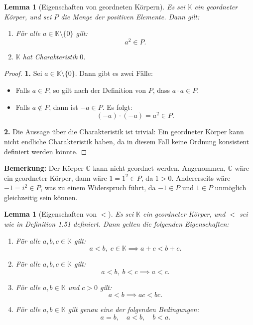 \documentclass[a4paper,12pt]{article}
\theoremstyle{break}
\newtheorem{lemma}[definition]{Lemma}
\begin{document}
\begin{lemma}[Eigenschaften von geordneten Körpern]
Es sei \(\mathbb{K}\) ein geordneter Körper, und sei \(P\) die Menge der positiven Elemente. Dann gilt:
\begin{enumerate}
    \item Für alle \(a \in \mathbb{K} \setminus \{0\}\) gilt:
    \[
    a^2 \in P.
    \]
    \item \(\mathbb{K}\) hat Charakteristik \(0\).
\end{enumerate}
\end{lemma}

\begin{proof}
\textbf{1.} Sei \(a \in \mathbb{K} \setminus \{0\}\). Dann gibt es zwei Fälle:
\begin{itemize}
    \item Falls \(a \in P\), so gilt nach der Definition von \(P\), dass \(a \cdot a \in P\).
    \item Falls \(a \notin P\), dann ist \(-a \in P\). Es folgt:
    \[
    (-a) \cdot (-a) = a^2 \in P.
    \]
\end{itemize}

\textbf{2.} Die Aussage über die Charakteristik ist trivial: Ein geordneter Körper kann nicht endliche Charakteristik haben, da in diesem Fall keine Ordnung konsistent definiert werden könnte.
\end{proof}

\textbf{Bemerkung:}
Der Körper \(\mathbb{C}\) kann nicht geordnet werden.  
Angenommen, \(\mathbb{C}\) wäre ein geordneter Körper, dann wäre \(1 = 1^2 \in P\), da \(1 > 0\). Andererseits wäre \(-1 = i^2 \in P\), was zu einem Widerspruch führt, da \(-1 \in P\) und \(1 \in P\) unmöglich gleichzeitig sein können.

\begin{lemma}[Eigenschaften von \(<\)]
Es sei \(\mathbb{K}\) ein geordneter Körper, und \(<\) sei wie in Definition 1.51 definiert. Dann gelten die folgenden Eigenschaften:
\begin{enumerate}
    \item Für alle \(a, b, c \in \mathbb{K}\) gilt:
    \[
    a < b, \; c \in \mathbb{K} \implies a + c < b + c.
    \]
    \item Für alle \(a, b, c \in \mathbb{K}\) gilt:
    \[
    a < b, \; b < c \implies a < c.
    \]
    \item Für alle \(a, b \in \mathbb{K}\) und \(c > 0\) gilt:
    \[
    a < b \implies ac < bc.
    \]
    \item Für alle \(a, b \in \mathbb{K}\) gilt genau eine der folgenden Bedingungen:
    \[
    a = b, \quad a < b, \quad b < a.
    \]
\end{enumerate}
\end{lemma}
\end{document}
